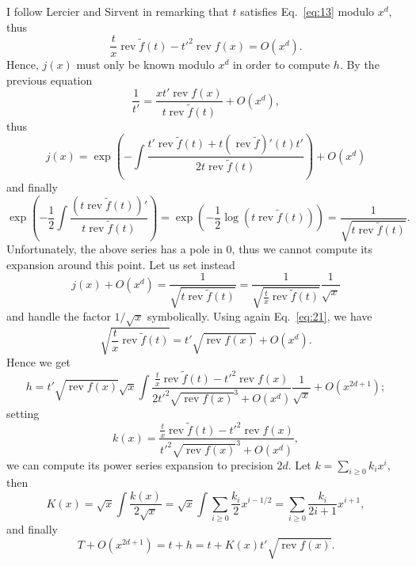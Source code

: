 \documentclass{article}
\DeclareMathOperator{\rev}{rev}
\begin{document}
I follow Lercier and Sirvent \cite{lercier+sirvent08} in remarking
that $t$ satisfies Eq.~\eqref{eq:13} modulo $x^d$, thus
\begin{equation}
  \label{eq:21}
  \frac{t}{x}\rev\tilde{f}(t) - {t'}^2\rev f(x) = O(x^d).
\end{equation}
Hence, $j(x)$ must only be known modulo $x^d$ in order to compute
$h$. By the previous equation
\begin{equation}
  \label{eq:22}
  \frac{1}{t'} = \frac{xt'\rev f(x)}{t\rev\tilde{f}(t)}  + O(x^d),
\end{equation}
thus
\begin{equation}
  \label{eq:23}
  j(x) = \exp\left(-\int \frac{t'\rev\tilde{f}(t) + t(\rev\tilde{f})'(t)t'}{2t\rev\tilde{f}(t)}\right) + O(x^d)
\end{equation}
and finally
\begin{equation}
  \label{eq:24}
  \exp\left(-\frac{1}{2}\int\frac{\left(t\rev\tilde{f}(t)\right)'}{t\rev\tilde{f}(t)}\right) =
  \exp\left(-\frac{1}{2}\log(t\rev\tilde{f}(t))\right) = \frac{1}{\sqrt{t\rev\tilde{f}(t)}}.
\end{equation}
Unfortunately, the above series has a pole in $0$, thus we cannot
compute its expansion around this point. Let us set instead 
\begin{equation}
  \label{eq:25}
  j(x) + O (x^d) = \frac{1}{\sqrt{t\rev\tilde{f}(t)}} = \frac{1}{\sqrt{\frac{t}{x}\rev\tilde{f}(t)}}\frac{1}{\sqrt{x}}
\end{equation}
and handle the factor $1/\sqrt{x}$ symbolically. Using again
Eq.~\eqref{eq:21}, we have
\begin{equation}
  \label{eq:30}
  \sqrt{\frac{t}{x}\rev\tilde{f}(t)} = t'\sqrt{\rev f(x)} + O(x^d).
\end{equation}
Hence we get
\begin{equation}
  \label{eq:26}
  h = t'\sqrt{\rev f(x)}\sqrt{x}
  \int \frac{\frac{t}{x}\rev\tilde{f}(t) - {t'}^2\rev f(x)}{2{t'}^2\sqrt{\rev f(x)}^3 + O(x^d)} \frac{1}{\sqrt{x}}
  + O(x^{2d+1});
\end{equation}
setting
\begin{equation}
  \label{eq:27}
  k(x) = \frac{\frac{t}{x}\rev\tilde{f}(t) - {t'}^2\rev f(x)}{{t'}^2\sqrt{\rev f(x)}^3 + O(x^d)},
\end{equation}
we can compute its power series expansion to precision $2d$. Let $k=\sum_{i\ge0} k_ix^i$, then
\begin{equation}
  \label{eq:28}
  K(x) = \sqrt{x}\int\frac{k(x)}{2\sqrt{x}} = \sqrt{x}\int\sum_{i\ge0}\frac{k_i}{2}x^{i-1/2} =
  \sum_{i\ge0}\frac{k_i}{2i+1}x^{i+1},
\end{equation}
and finally
\begin{equation}
  \label{eq:29}
  T + O(x^{2d+1}) = t+h = t+K(x)t'\sqrt{\rev f(x)}.
\end{equation}
\end{document}
